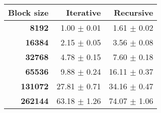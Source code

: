 \begin{tabular}{rrr}\toprule
\textbf{Block size}  & \textbf{Iterative} & \textbf{Recursive}\\\midrule
\textbf{8192}  & 1.00 $\pm$ 0.01 & 1.61 $\pm$ 0.02\\
\textbf{16384}  & 2.15 $\pm$ 0.05 & 3.56 $\pm$ 0.08\\
\textbf{32768}  & 4.78 $\pm$ 0.15 & 7.60 $\pm$ 0.18\\
\textbf{65536}  & 9.88 $\pm$ 0.24 & 16.11 $\pm$ 0.37\\
\textbf{131072}  & 27.81 $\pm$ 0.71 & 34.16 $\pm$ 0.47\\
\textbf{262144} & 63.18 $\pm$ 1.26 & 74.07 $\pm$ 1.06\\
\bottomrule
\end{tabular}
